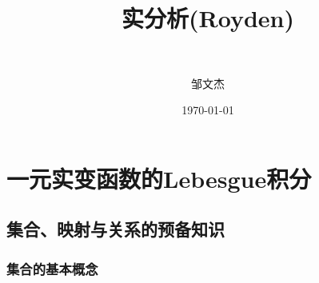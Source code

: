 \documentclass[lang=cn,newtx,10pt,scheme=chinese]{../Template/elegantbook}
\title{实分析(Royden)}
\subtitle{\,\,}
\author{邹文杰}
\institute{无}
\date{\today}
\begin{document}
\maketitle
\frontmatter

\tableofcontents

\mainmatter%


\part{一元实变函数的Lebesgue积分}

\chapter{集合、映射与关系的预备知识}

\section{集合的基本概念}
\end{document}

